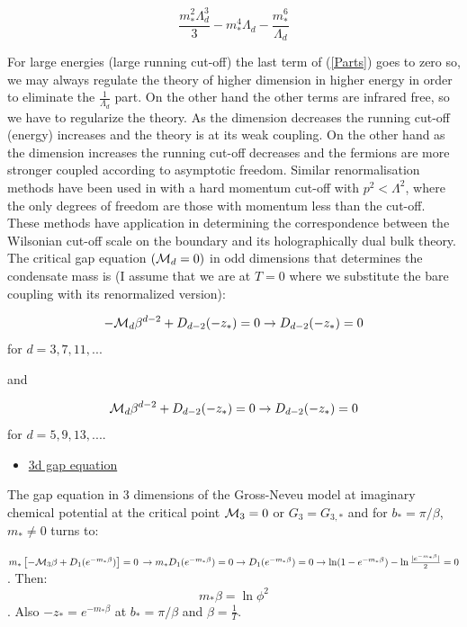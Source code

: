 \documentclass[twoside]{article}
\begin{document}
\begin{equation}
\label{Parts}
\frac{m_*^2\Lambda_d^3}{3}-m_*^4\Lambda_d-\frac{m_*^6}{\Lambda_d}
\end{equation}

For large energies (large running cut-off) the last term of ({\ref{Parts}}) goes to zero so, we may always regulate the theory of higher dimension in higher energy in order to eliminate the $\frac{1}{\Lambda_d}$ part. On the other hand the other terms are infrared free, so we have to regularize the theory. As the dimension decreases the running cut-off (energy) increases and the theory is at its weak coupling. On the other hand as the dimension increases the running cut-off decreases and the fermions are more stronger coupled according to asymptotic freedom. Similar renormalisation methods have been used in \cite{Evans, Grozdanov} with a hard momentum cut-off with $p^2<\Lambda^2$, where the only degrees of freedom are those with momentum less than the cut-off. These methods have application in 
determining the correspondence between the Wilsonian cut-off scale on the boundary and its holographically dual bulk theory.
The critical gap equation $({\cal M}_d=0)$ in odd dimensions that determines the condensate mass is (I assume that we are at $T=0$ where we substitute the bare coupling with its renormalized version):

\begin{equation}
-{\cal M}_d\beta^{d-2}+D_{d-2}(-z_*)=0\rightarrow D_{d-2}(-z_*)=0
\end{equation}
for $d=3,7,11,...$

and 

\begin{equation}
{\cal M}_d\beta^{d-2}+D_{d-2}(-z_*)=0\rightarrow D_{d-2}(-z_*)=0
\end{equation}
for $d=5,9,13,...$. 
 
 \begin{itemize}
 	\item \underline{3d gap equation}
 \end{itemize}
 
 The gap equation in 3 dimensions of the Gross-Neveu model at imaginary chemical potential at the critical point ${\cal M}_3=0$ or $G_3=G_{3,*}$ and for $b_*=\pi/\beta$, $m_*\not=0$ turns to:
 
 $m_*\left[-{\cal M}_3\beta+D_1(e^{-m_*\beta})\right]=0\,\rightarrow m_* D_1(e^{-m_*\beta})=0\rightarrow D_1(e^{-m_*\beta})=0\rightarrow \ln(1-e^{-m_*\beta})-\ln\frac{|e^{-m_*\beta}|}{2}=0$. Then: 
 \begin{equation}
 \boxed
 {m_*\beta=\ln\phi^2}
 \end{equation}
 \cite {Filothodoros:2016txa,Sachdev:1993pr}.
  Also $-z_*=e^{-m_*\beta}$ at $b_*=\pi/\beta$ and $\beta=\frac{1}{T}$. 
 
\end{document}
